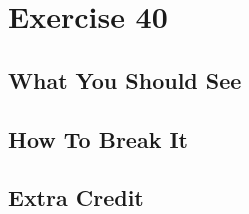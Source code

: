 \chapter{Exercise 40}


\section{What You Should See}


\section{How To Break It}


\section{Extra Credit}



